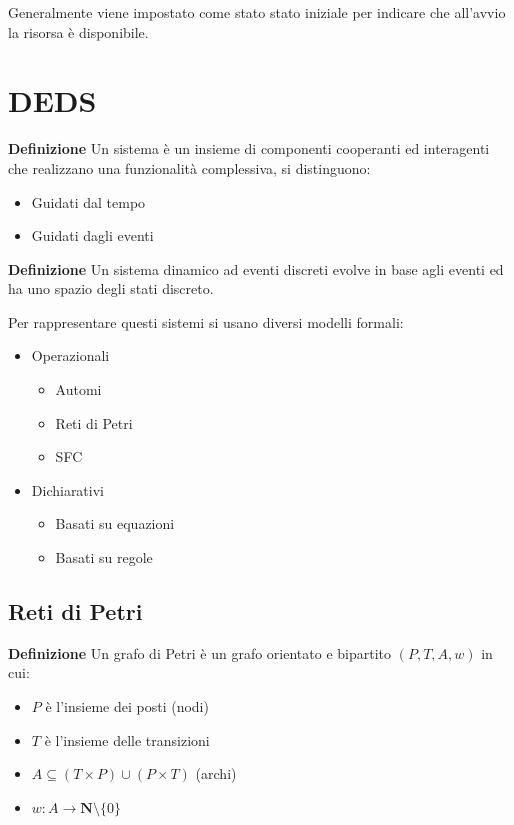 \documentclass{article}
\newcommand{\df}[1]{\noindent\textbf{Definizione } #1.\newline}
\begin{document}
\vspace{10pt}

\noindent Generalmente viene impostato come stato stato iniziale per indicare che all'avvio la risorsa è disponibile.

\section{DEDS}

\textbf{Definizione} Un sistema è un insieme di componenti cooperanti ed interagenti che realizzano una funzionalità complessiva, si distinguono:
\begin{itemize}
    \item Guidati dal tempo
    \item Guidati dagli eventi\newline
\end{itemize}

\df{Un sistema dinamico ad eventi discreti evolve in base agli eventi ed ha uno spazio degli stati discreto}

\noindent Per rappresentare questi sistemi si usano diversi modelli formali:
\begin{itemize}
    \item Operazionali
        \begin{itemize}
            \item Automi
            \item Reti di Petri
            \item SFC
        \end{itemize}
    \item Dichiarativi
        \begin{itemize}
            \item Basati su equazioni
            \item Basati su regole\newline
        \end{itemize}
\end{itemize}

\subsection{Reti di Petri}

\textbf{Definizione} Un grafo di Petri è un grafo orientato e bipartito $(P,T,A,w)$ in cui:
\begin{itemize}
    \item $P$ è l'insieme dei posti (nodi)
    \item $T$ è l'insieme delle transizioni
    \item $A\subseteq(T\times P)\cup(P\times T)$ (archi)
    \item $w:A\rightarrow\mathbf{N}\setminus\{0\}$
\end{itemize}
\end{document}
